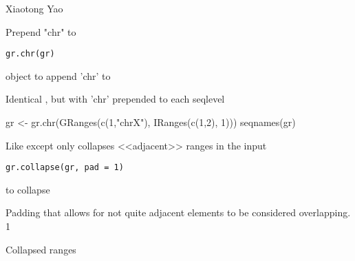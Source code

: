\documentclass[a4paper]{book}
\begin{document}
%
\begin{Author}\relax
Xiaotong Yao
\end{Author}
%
\begin{Description}\relax
Prepend "chr" to 
\end{Description}
%
\begin{Usage}
\begin{verbatim}
gr.chr(gr)
\end{verbatim}
\end{Usage}
%
\begin{Arguments}
\begin{ldescription}
\item[\code{gr}]  object to append 'chr' to
\end{ldescription}
\end{Arguments}
%
\begin{Value}
Identical , but with 'chr' prepended to each seqlevel
\end{Value}
%
\begin{Examples}
\begin{ExampleCode}
gr <-  gr.chr(GRanges(c(1,"chrX"), IRanges(c(1,2), 1)))
seqnames(gr)
\end{ExampleCode}
\end{Examples}
%
\begin{Description}\relax
Like  except only collapses <<adjacent>> ranges in the input
\end{Description}
%
\begin{Usage}
\begin{verbatim}
gr.collapse(gr, pad = 1)
\end{verbatim}
\end{Usage}
%
\begin{Arguments}
\begin{ldescription}
\item[\code{gr}]  to collapse

\item[\code{pad}] Padding that allows for not quite adjacent elements to be considered overlapping. 1
\end{ldescription}
\end{Arguments}
%
\begin{Value}
Collapsed ranges
\end{Value}
%
\end{document}
